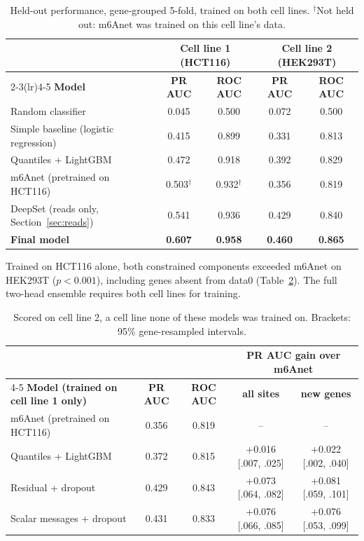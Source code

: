 \documentclass[11pt,a4paper]{article}
\begin{document}
\begin{table}[H]
    \centering\small
    \begin{tabular}{lcccc}
        \toprule
        & \multicolumn{2}{c}{\textbf{Cell line 1 (HCT116)}} & \multicolumn{2}{c}{\textbf{Cell line 2 (HEK293T)}} \\
        \cmidrule(lr){2-3}\cmidrule(lr){4-5}
        \textbf{Model} & \textbf{PR AUC} & \textbf{ROC AUC} & \textbf{PR AUC} & \textbf{ROC AUC} \\
        \midrule
        Random classifier & 0.045 & 0.500 & 0.072 & 0.500 \\
        Simple baseline (logistic regression) & 0.415 & 0.899 & 0.331 & 0.813 \\
        Quantiles + LightGBM & 0.472 & 0.918 & 0.392 & 0.829 \\
        m6Anet (pretrained on HCT116) & 0.503$^\dagger$ & 0.932$^\dagger$ & 0.356 & 0.819 \\
        DeepSet (reads only, Section~\ref{sec:reads}) & 0.541 & 0.936 & 0.429 & 0.840 \\
        \textbf{Final model} & \textbf{0.607} & \textbf{0.958} & \textbf{0.460} & \textbf{0.865} \\
        \bottomrule
    \end{tabular}
    \caption{Held-out performance, gene-grouped 5-fold, trained on both cell
    lines. $^\dagger$Not held out: m6Anet was trained on this cell line's data.}
    \label{tab:model_comparison}
\end{table}

Trained on HCT116 alone, both constrained components exceeded m6Anet on
HEK293T ($p<0.001$), including genes absent from data0
(Table~\ref{tab:m6anet_gain}). The full two-head ensemble requires both
cell lines for training.

\begin{table}[H]
    \centering\small
    \begin{tabular}{lcccc}
        \toprule
        & & & \multicolumn{2}{c}{\textbf{PR AUC gain over m6Anet}} \\
        \cmidrule(lr){4-5}
        \textbf{Model (trained on cell line 1 only)} & \textbf{PR AUC} & \textbf{ROC AUC} & \textbf{all sites} & \textbf{new genes} \\
        \midrule
        m6Anet (pretrained on HCT116) & 0.356 & 0.819 & -- & -- \\
        Quantiles + LightGBM & 0.372 & 0.815 & +0.016 [.007, .025] & +0.022 [.002, .040] \\
        Residual + dropout & 0.429 & 0.843 & +0.073 [.064, .082] & +0.081 [.059, .101] \\
        Scalar messages + dropout & 0.431 & 0.833 & +0.076 [.066, .085] & +0.076 [.053, .099] \\
        \bottomrule
    \end{tabular}
    \caption{Scored on cell line 2, a cell line none of these models was
    trained on. Brackets: 95\% gene-resampled intervals.}
    \label{tab:m6anet_gain}
\end{table}
\end{document}
